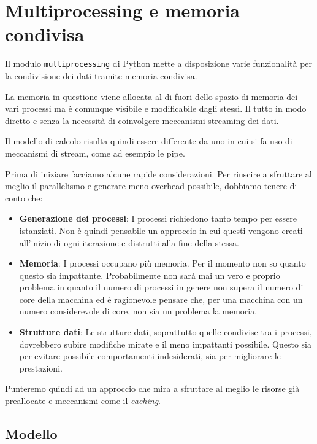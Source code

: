 \section{Multiprocessing e memoria condivisa}

Il modulo \verb|multiprocessing| di Python mette a disposizione varie
funzionalità per la condivisione dei dati tramite memoria condivisa.

La memoria in questione viene allocata al di fuori dello spazio di memoria dei
vari processi ma è comunque visibile e modificabile dagli stessi. Il tutto in
modo diretto e senza la necessità di coinvolgere meccanismi streaming dei dati.

Il modello di calcolo risulta quindi essere differente da uno in cui si fa uso
di meccanismi di stream, come ad esempio le pipe.

Prima di iniziare facciamo alcune rapide considerazioni. Per riuscire a
sfruttare al meglio il parallelismo e generare meno overhead possibile,
dobbiamo tenere di conto che:
\begin{itemize}
	\item \textbf{Generazione dei processi}: I processi richiedono tanto tempo
	      per essere istanziati. Non è quindi pensabile un approccio in cui
	      questi vengono creati all'inizio di ogni iterazione e distrutti alla
	      fine della stessa.
	\item \textbf{Memoria}: I processi occupano più memoria. Per il momento non
	      so quanto questo sia impattante. Probabilmente non sarà mai un vero e
	      proprio problema in quanto il numero di processi in genere non supera
	      il numero di core della macchina ed è ragionevole pensare che, per
	      una macchina con un numero considerevole di core, non sia un problema
	      la memoria.
	\item \textbf{Strutture dati}: Le strutture dati, soprattutto quelle
	      condivise tra i processi, dovrebbero subire modifiche mirate e il
	      meno impattanti possibile. Questo sia per evitare possibile
	      comportamenti indesiderati, sia per migliorare le prestazioni.
\end{itemize}
Punteremo quindi ad un approccio che mira a sfruttare al meglio le risorse già
preallocate e meccanismi come il \emph{caching}.

\subsection{Modello}

